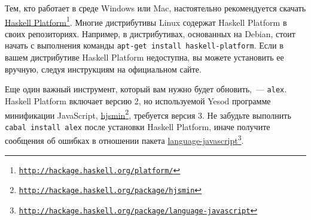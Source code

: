 Тем, кто работает в среде Windows или Mac, настоятельно рекомендуется скачать \href{http://hackage.haskell.org/platform/}{Haskell Platform}\footnote{\href{http://hackage.haskell.org/platform/}{\texttt{http://hackage.haskell.org/platform/}}}. Многие дистрибутивы Linux содержат Haskell Platform в своих репозиториях. Например, в дистрибутивах, основанных на Debian, стоит начать с выполнения команды \texttt{apt-get install haskell-platform}. Если в вашем дистрибутиве Haskell Platform недоступна, вы можете установить ее вручную, следуя инструкциям на официальном сайте.

Еще один важный инструмент, который вам нужно будет обновить,~--- \texttt{alex}. Haskell Platform включает версию 2, но используемой Yesod программе минификации JavaScript, \href{http://hackage.haskell.org/package/hjsmin}{hjsmin}\footnote{\href{http://hackage.haskell.org/package/hjsmin}{\texttt{http://hackage.haskell.org/package/hjsmin}}}, требуется версия 3. Не забудьте выполнить \texttt{cabal install alex} после установки Haskell Platform, иначе получите сообщения об ошибках в отношении пакета \href{http://hackage.haskell.org/package/language-javascript}{language-javascript}\footnote{\href{http://hackage.haskell.org/package/language-javascript}{\texttt{http://hackage.haskell.org/package/language-javascript}}}.


